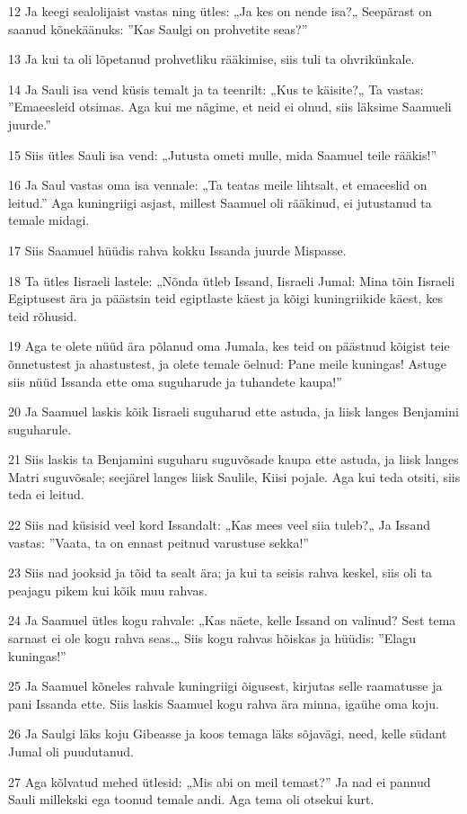 \par 12 Ja keegi sealolijaist vastas ning ütles: „Ja kes on nende isa?„ Seepärast on saanud kõnekäänuks: ”Kas Saulgi on prohvetite seas?”
\par 13 Ja kui ta oli lõpetanud prohvetliku rääkimise, siis tuli ta ohvrikünkale.
\par 14 Ja Sauli isa vend küsis temalt ja ta teenrilt: „Kus te käisite?„ Ta vastas: ”Emaeesleid otsimas. Aga kui me nägime, et neid ei olnud, siis läksime Saamueli juurde.”
\par 15 Siis ütles Sauli isa vend: „Jutusta ometi mulle, mida Saamuel teile rääkis!”
\par 16 Ja Saul vastas oma isa vennale: „Ta teatas meile lihtsalt, et emaeeslid on leitud.” Aga kuningriigi asjast, millest Saamuel oli rääkinud, ei jutustanud ta temale midagi.
\par 17 Siis Saamuel hüüdis rahva kokku Issanda juurde Mispasse.
\par 18 Ta ütles Iisraeli lastele: „Nõnda ütleb Issand, Iisraeli Jumal: Mina tõin Iisraeli Egiptusest ära ja päästsin teid egiptlaste käest ja kõigi kuningriikide käest, kes teid rõhusid.
\par 19 Aga te olete nüüd ära põlanud oma Jumala, kes teid on päästnud kõigist teie õnnetustest ja ahastustest, ja olete temale öelnud: Pane meile kuningas! Astuge siis nüüd Issanda ette oma suguharude ja tuhandete kaupa!”
\par 20 Ja Saamuel laskis kõik Iisraeli suguharud ette astuda, ja liisk langes Benjamini suguharule.
\par 21 Siis laskis ta Benjamini suguharu suguvõsade kaupa ette astuda, ja liisk langes Matri suguvõsale; seejärel langes liisk Saulile, Kiisi pojale. Aga kui teda otsiti, siis teda ei leitud.
\par 22 Siis nad küsisid veel kord Issandalt: „Kas mees veel siia tuleb?„ Ja Issand vastas: ”Vaata, ta on ennast peitnud varustuse sekka!”
\par 23 Siis nad jooksid ja tõid ta sealt ära; ja kui ta seisis rahva keskel, siis oli ta peajagu pikem kui kõik muu rahvas.
\par 24 Ja Saamuel ütles kogu rahvale: „Kas näete, kelle Issand on valinud? Sest tema sarnast ei ole kogu rahva seas.„ Siis kogu rahvas hõiskas ja hüüdis: ”Elagu kuningas!”
\par 25 Ja Saamuel kõneles rahvale kuningriigi õigusest, kirjutas selle raamatusse ja pani Issanda ette. Siis laskis Saamuel kogu rahva ära minna, igaühe oma koju.
\par 26 Ja Saulgi läks koju Gibeasse ja koos temaga läks sõjavägi, need, kelle südant Jumal oli puudutanud.
\par 27 Aga kõlvatud mehed ütlesid: „Mis abi on meil temast?” Ja nad ei pannud Sauli millekski ega toonud temale andi. Aga tema oli otsekui kurt.

